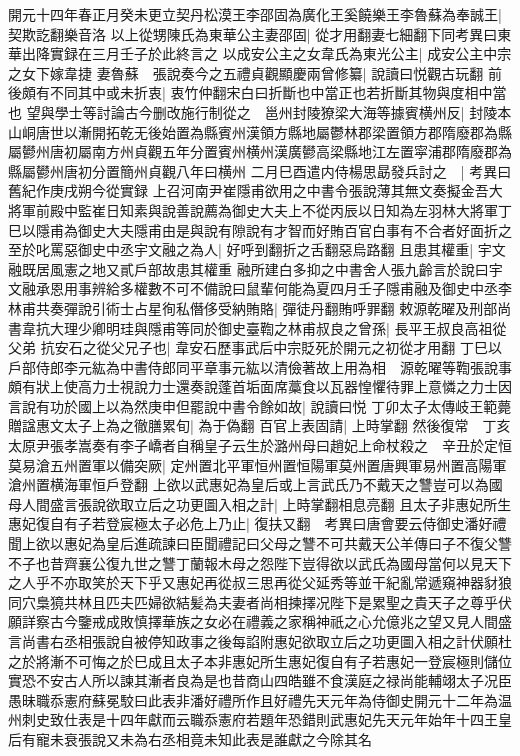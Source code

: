 開元十四年春正月癸未更立契丹松漠王李邵固為廣化王奚饒樂王李魯蘇為奉誠王|{
	契欺訖翻樂音洛}
以上從甥陳氏為東華公主妻邵固|{
	從才用翻妻七細翻下同考異曰東華出降實録在三月壬子於此終言之}
以成安公主之女韋氏為東光公主|{
	成安公主中宗之女下嫁韋捷}
妻魯蘇　張說奏今之五禮貞觀顯慶兩曾修纂|{
	說讀曰悦觀古玩翻}
前後頗有不同其中或未折衷|{
	衷竹仲翻宋白曰折斷也中當正也若折斷其物與度相中當也}
望與學士等討論古今删改施行制從之　邕州封陵獠梁大海等據賓横州反|{
	封陵本山峒唐世以漸開拓乾无後始置為縣賓州漢領方縣地屬鬱林郡梁置領方郡隋廢郡為縣屬鬰州唐初屬南方州貞觀五年分置賓州横州漢廣鬰高梁縣地江左置寜浦郡隋廢郡為縣屬鬰州唐初分置簡州貞觀八年曰横州}
二月巳酉遣内侍楊思勗發兵討之　|{
	考異曰舊紀作庚戌朔今從實録}
上召河南尹崔隱甫欲用之中書令張說薄其無文奏擬金吾大將軍前殿中監崔日知素與說善說薦為御史大夫上不從丙辰以日知為左羽林大將軍丁巳以隱甫為御史大夫隱甫由是與說有隙說有才智而好賄百官白事有不合者好面折之至於叱罵惡御史中丞宇文融之為人|{
	好呼到翻折之舌翻惡烏路翻}
且患其權重|{
	宇文融既居風憲之地又貳戶部故患其權重}
融所建白多抑之中書舍人張九齡言於說曰宇文融承恩用事辨給多權數不可不備說曰鼠輩何能為夏四月壬子隱甫融及御史中丞李林甫共奏彈說引術士占星徇私僭侈受納賄賂|{
	彈徒丹翻賄呼罪翻}
敕源乾曜及刑部尚書韋抗大理少卿明珪與隱甫等同於御史臺鞫之林甫叔良之曾孫|{
	長平王叔良高祖從父弟}
抗安石之從父兄子也|{
	韋安石歷事武后中宗貶死於開元之初從才用翻}
丁巳以戶部侍郎李元紘為中書侍郎同平章事元紘以清儉著故上用為相　源乾曜等鞫張說事頗有狀上使高力士視說力士還奏說蓬首垢面席藁食以瓦器惶懼待罪上意憐之力士因言說有功於國上以為然庚申但罷說中書令餘如故|{
	說讀曰悦}
丁卯太子太傳岐王範薨贈諡惠文太子上為之徹膳累旬|{
	為于偽翻}
百官上表固請|{
	上時掌翻}
然後復常　丁亥太原尹張孝嵩奏有李子嶠者自稱皇子云生於潞州母曰趙妃上命杖殺之　辛丑於定恒莫易滄五州置軍以備突厥|{
	定州置北平軍恒州置恒陽軍莫州置唐興軍易州置高陽軍滄州置横海軍恒戶登翻}
上欲以武惠妃為皇后或上言武氏乃不戴天之讐豈可以為國母人間盛言張說欲取立后之功更圖入相之計|{
	上時掌翻相息亮翻}
且太子非惠妃所生惠妃復自有子若登宸極太子必危上乃止|{
	復扶又翻　考異曰唐會要云侍御史潘好禮聞上欲以惠妃為皇后進疏諫曰臣聞禮記曰父母之讐不可共戴天公羊傳曰子不復父讐不子也昔齊襄公復九世之讐丁蘭報木母之怨陛下豈得欲以武氏為國母當何以見天下之人乎不亦取笑於天下乎又惠妃再從叔三思再從父延秀等並干紀亂常遞窺神器豺狼同穴梟獍共林且匹夫匹婦欲結髪為夫妻者尚相揀擇况陛下是累聖之貴天子之尊乎伏願詳察古今鑒戒成敗慎擇華族之女必在禮義之家稱神祇之心允億兆之望又見人間盛言尚書右丞相張說自被停知政事之後每諂附惠妃欲取立后之功更圖入相之計伏願杜之於將漸不可悔之於巳成且太子本非惠妃所生惠妃復自有子若惠妃一登宸極則儲位實恐不安古人所以諫其漸者良為是也昔商山四皓雖不食漢庭之禄尚能輔翊太子况臣愚昧職忝憲府蘇冕駮曰此表非潘好禮所作且好禮先天元年為侍御史開元十二年為温州刺史致仕表是十四年獻而云職忝憲府若題年恐錯則武惠妃先天元年始年十四王皇后有寵未衰張說又未為右丞相竟未知此表是誰獻之今除其名}
